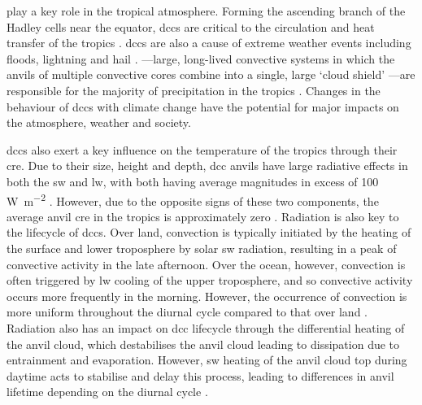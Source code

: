 \documentclass[acp, manuscript]{copernicus}
\begin{document}


\introduction  %
 play a key role in the tropical atmosphere. 
Forming the ascending branch of the Hadley cells near the equator, \acrshort{dcc}s are critical to the circulation and heat transfer of the tropics \citep{riehl_heat_1958, weisman_mesoscale_2015}. 
\acrshort{dcc}s are also a cause of extreme weather events including floods, lightning and hail \citep{westra_future_2014}. 
---large, long-lived convective systems in which the anvils of multiple convective cores combine into a single, large `cloud shield' \citep{chen_diurnal_1997, houze_mesoscale_2004, roca_simple_2017}---are responsible for the majority of precipitation in the tropics \citep{feng_global_2021}. 
Changes in the behaviour of \acrshort{dcc}s with climate change have the potential for major impacts on the atmosphere, weather and society.

\acrshort{dcc}s also exert a key influence on the temperature of the tropics through their \acrfull{cre}. 
Due to their size, height and depth, \acrshort{dcc} anvils have large radiative effects in both the \acrfull{sw} and \acrfull{lw}, with both having average magnitudes in excess of 100\,\unit{W m^{-2}} \citep{hartmann_tropical_2016, wall_balanced_2018}. 
However, due to the opposite signs of these two components, the average anvil \acrshort{cre} in the tropics is approximately zero \citep{ramanathan_cloudradiative_1989, hartmann_effect_1992, stephens_cloudsat_2018}. 
Radiation is also key to the lifecycle of \acrshort{dcc}s. 
Over land, convection is typically initiated by the heating of the surface and lower troposphere by solar \acrshort{sw} radiation, resulting in a peak of convective activity in the late afternoon. 
Over the ocean, however, convection is often triggered by \acrshort{lw} cooling of the upper troposphere, and so convective activity occurs more frequently in the morning. 
However, the occurrence of convection is more uniform throughout the diurnal cycle compared to that over land \citep{taylor_evaluating_2017}. 
Radiation also has an impact on \acrshort{dcc} lifecycle through the differential heating of the anvil cloud, which destabilises the anvil cloud leading to dissipation due to entrainment and evaporation. 
However, \acrshort{sw} heating of the anvil cloud top during daytime acts to stabilise and delay this process, leading to differences in anvil lifetime depending on the diurnal cycle \citep{harrop_role_2016, sokol_tropical_2020, wall_observational_2020}.
\end{document}
